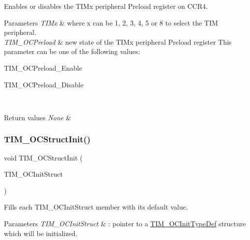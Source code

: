 Enables or disables the T\+I\+Mx peripheral Preload register on C\+C\+R4. 


\begin{DoxyParams}{Parameters}
{\em T\+I\+Mx} & where x can be 1, 2, 3, 4, 5 or 8 to select the T\+IM peripheral. \\
\hline
{\em T\+I\+M\+\_\+\+O\+C\+Preload} & new state of the T\+I\+Mx peripheral Preload register This parameter can be one of the following values\+: \begin{DoxyItemize}
\item T\+I\+M\+\_\+\+O\+C\+Preload\+\_\+\+Enable \item T\+I\+M\+\_\+\+O\+C\+Preload\+\_\+\+Disable \end{DoxyItemize}
\\
\hline
\end{DoxyParams}

\begin{DoxyRetVals}{Return values}
{\em None} & \\
\hline
\end{DoxyRetVals}
\mbox{\label{group___t_i_m___private___functions_ga394683c78ae02837882e36014e11643e}} 
\subsubsection{\texorpdfstring{TIM\_OCStructInit()}{TIM\_OCStructInit()}}
{\footnotesize\ttfamily void T\+I\+M\+\_\+\+O\+C\+Struct\+Init (\begin{DoxyParamCaption}\item[{\mbox{\hyperlink{struct_t_i_m___o_c_init_type_def}{T\+I\+M\+\_\+\+O\+C\+Init\+Type\+Def}} $\ast$}]{T\+I\+M\+\_\+\+O\+C\+Init\+Struct }\end{DoxyParamCaption})}



Fills each T\+I\+M\+\_\+\+O\+C\+Init\+Struct member with its default value. 


\begin{DoxyParams}{Parameters}
{\em T\+I\+M\+\_\+\+O\+C\+Init\+Struct} & \+: pointer to a \mbox{\hyperlink{struct_t_i_m___o_c_init_type_def}{T\+I\+M\+\_\+\+O\+C\+Init\+Type\+Def}} structure which will be initialized. \\
\hline
\end{DoxyParams}

